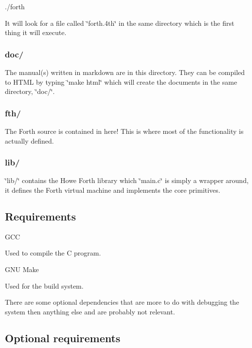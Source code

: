 ./forth

It will look for a file called \char`\"{}forth.\-4th\char`\"{} in the same directory which is the first thing it will execute.

\subsubsection*{doc/}

The manual(s) written in markdown are in this directory. They can be compiled to H\-T\-M\-L by typing \char`\"{}make html\char`\"{} which will create the documents in the same directory, \char`\"{}doc/\char`\"{}.

\subsubsection*{fth/}

The Forth source is contained in here! This is where most of the functionality is actually defined.

\subsubsection*{lib/}

\char`\"{}lib/\char`\"{} contains the Howe Forth library which \char`\"{}main.\-c\char`\"{} is simply a wrapper around, it defines the Forth virtual machine and implements the core primitives.

\subsection*{Requirements}


\begin{DoxyItemize}
\item G\-C\-C
\end{DoxyItemize}

Used to compile the C program.


\begin{DoxyItemize}
\item G\-N\-U Make
\end{DoxyItemize}

Used for the build system.

There are some optional dependencies that are more to do with debugging the system then anything else and are probably not relevant.

\subsection*{Optional requirements}

